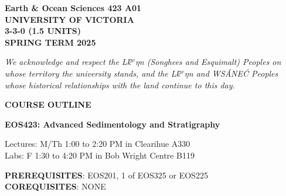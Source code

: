 \documentclass[11pt]{article}
\def\schwa{{\tenipa\char64}}
\begin{document}

%


\hspace*{\fill}\textbf{Earth \& Ocean Sciences 423 A01}\\
\hspace*{\fill}\textbf{UNIVERSITY OF VICTORIA}\\
\hspace*{\fill}\textbf{3-3-0 (1.5 UNITS)}\\
\hspace*{\fill}\textbf{SPRING TERM 2025}\\


\noindent\hrulefill

\begin{center}
\emph{We acknowledge and respect the L\schwa\'k$^w$\schwa ŋ\schwa n (Songhees and Esquimalt) Peoples on whose territory the university stands, and the L\schwa\'k$^w$\schwa ŋ\schwa n and WS\'ANE\'C Peoples whose historical relationships with the land continue to this day.}
\end{center}

\noindent\hrulefill

\begin{center}
\Large \textbf{COURSE OUTLINE}

\Large \textbf{EOS423: Advanced Sedimentology and Stratigraphy}

\normalsize Lectures: M/Th 1:00 to 2:20 PM in Clearihue A330 \\
\normalsize Labs: F 1:30 to 4:20 PM in Bob Wright Centre B119 \\
\end{center}

\noindent\hrulefill

\textbf{PREREQUISITES}: EOS201, 1 of EOS325 or EOS225\\
\textbf{COREQUISITES}: NONE\\
\end{document}
